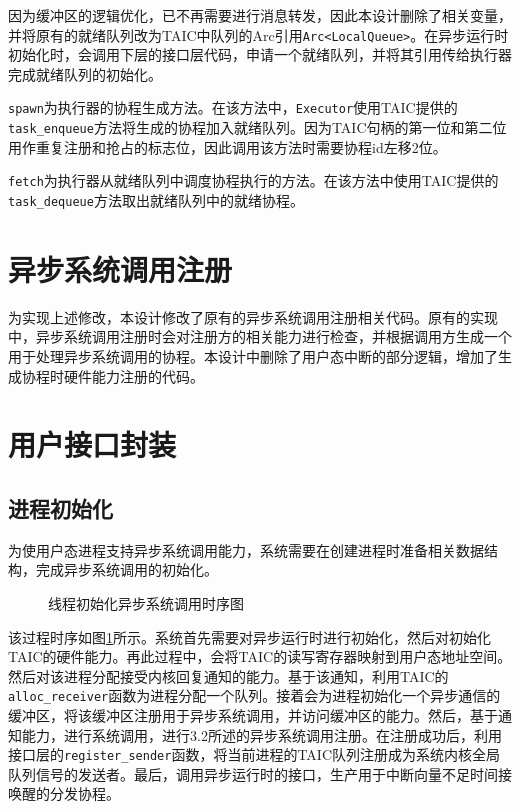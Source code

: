 因为缓冲区的逻辑优化，已不再需要进行消息转发，因此本设计删除了相关变量，并将原有的就绪队列改为TAIC中队列的Arc引用\texttt{Arc<LocalQueue>}。在异步运行时初始化时，会调用下层的接口层代码，申请一个就绪队列，并将其引用传给执行器完成就绪队列的初始化。

\texttt{spawn}为执行器的协程生成方法。在该方法中，\texttt{Executor}使用TAIC提供的\texttt{task\_enqueue}方法将生成的协程加入就绪队列。因为TAIC句柄的第一位和第二位用作重复注册和抢占的标志位，因此调用该方法时需要协程id左移2位。

\texttt{fetch}为执行器从就绪队列中调度协程执行的方法。在该方法中使用TAIC提供的\texttt{task\_dequeue}方法取出就绪队列中的就绪协程。


\section{异步系统调用注册}

为实现上述修改，本设计修改了原有的异步系统调用注册相关代码。原有的实现中，异步系统调用注册时会对注册方的相关能力进行检查，并根据调用方生成一个用于处理异步系统调用的协程。本设计中删除了用户态中断的部分逻辑，增加了生成协程时硬件能力注册的代码。


\section{用户接口封装}

\subsection{进程初始化}

为使用户态进程支持异步系统调用能力，系统需要在创建进程时准备相关数据结构，完成异步系统调用的初始化。

\begin{figure}[htbp]
  \centering
  
  \caption{线程初始化异步系统调用时序图}\label{initsyscall}
\end{figure}

该过程时序如图\ref{initsyscall}所示。系统首先需要对异步运行时进行初始化，然后对初始化TAIC的硬件能力。再此过程中，会将TAIC的读写寄存器映射到用户态地址空间。然后对该进程分配接受内核回复通知的能力。基于该通知，利用TAIC的\texttt{alloc\_receiver}函数为进程分配一个队列。接着会为进程初始化一个异步通信的缓冲区，将该缓冲区注册用于异步系统调用，并访问缓冲区的能力。然后，基于通知能力，进行系统调用，进行3.2所述的异步系统调用注册。在注册成功后，利用接口层的\texttt{register\_sender}函数，将当前进程的TAIC队列注册成为系统内核全局队列信号的发送者。最后，调用异步运行时的接口，生产用于中断向量不足时间接唤醒的分发协程。


